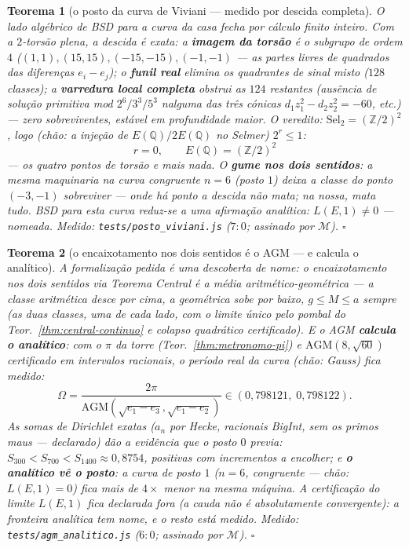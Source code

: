\documentclass[11pt,a4paper]{article}
\newtheorem{teorema}{Teorema}
\newcommand{\code}[1]{\texttt{\small #1}}
\begin{document}
\begin{teorema}[o posto da curva de Viviani --- medido por descida
completa]\label{thm:posto}
O lado algébrico de BSD para a curva da casa fecha por cálculo finito
inteiro. Com a $2$-torsão plena, a descida é exata: a \textbf{imagem
da torsão} é o subgrupo de ordem $4$
($(1,1),(15,15),(-15,-15),(-1,-1)$ --- as partes livres de quadrados
das diferenças $e_{i}-e_{j}$); o \textbf{funil real} elimina os
quadrantes de sinal misto ($128$ classes); a \textbf{varredura local
completa} obstrui as $124$ restantes (ausência de solução primitiva
mod $2^{6}/3^{3}/5^{3}$ nalguma das três cónicas
$d_{1}z_{1}^{2}-d_{2}z_{2}^{2}=-60$, etc.) --- \emph{zero
sobreviventes}, estável em profundidade maior. O veredito:
$\mathrm{Sel}_{2}=(\mathbb{Z}/2)^{2}$, logo (chão: a injeção de
$E(\mathbb{Q})/2E(\mathbb{Q})$ no Selmer) $2^{r}\le1$:
\[
\boxed{\;r=0,\qquad E(\mathbb{Q})=(\mathbb{Z}/2)^{2}\;}
\]
--- os quatro pontos de torsão e mais nada. O \textbf{gume nos dois
sentidos}: a mesma maquinaria na curva congruente $n{=}6$ (posto $1$)
deixa a classe do ponto $(-3,-1)$ \emph{sobreviver} --- onde há ponto
a descida não mata; na nossa, mata tudo. \emph{BSD para esta curva
reduz-se a uma afirmação analítica: $L(E,1)\ne0$ --- nomeada.}
\emph{Medido:} \code{tests/posto\_viviani.js} ($7{:}0$; assinado por
$\mathcal{M}$).
$\square$
\end{teorema}

\begin{teorema}[o encaixotamento nos dois sentidos é o AGM --- e
calcula o analítico]\label{thm:agm-analitico}
A formalização pedida é uma descoberta de nome: \emph{o encaixotamento
nos dois sentidos via Teorema Central é a média
aritmético-geométrica} --- a classe aritmética desce por cima, a
geométrica sobe por baixo, $g\le M\le a$ sempre (as duas classes,
uma de cada lado, com o limite único pelo pombal do
Teor.~\ref{thm:central-continuo} e colapso quadrático certificado).
E o AGM \textbf{calcula o analítico}: com o $\pi$ da torre
(Teor.~\ref{thm:metronomo-pi}) e $\mathrm{AGM}(8,\sqrt{60})$
certificado em intervalos racionais, o período real da curva
(chão: Gauss) fica medido:
\[
\Omega=\frac{2\pi}{\mathrm{AGM}(\sqrt{e_{1}-e_{3}},\sqrt{e_{1}-e_{2}})}
\in(0{,}798121,\;0{,}798122).
\]
As somas de Dirichlet \emph{exatas} ($a_{n}$ por Hecke, racionais
BigInt, sem os primos maus --- declarado) dão a evidência que o posto
$0$ previa: $S_{300}<S_{700}<S_{1400}\approx0{,}8754$, positivas com
incrementos a encolher; e \textbf{o analítico vê o posto}: a curva de
posto $1$ ($n{=}6$, congruente --- chão: $L(E,1)=0$) fica mais de
$4\times$ menor na mesma máquina. A certificação do limite $L(E,1)$
fica declarada fora (a cauda não é absolutamente convergente): a
fronteira analítica tem nome, e o resto está medido.
\emph{Medido:} \code{tests/agm\_analitico.js} ($6{:}0$; assinado por
$\mathcal{M}$).
$\square$
\end{teorema}
\end{document}
